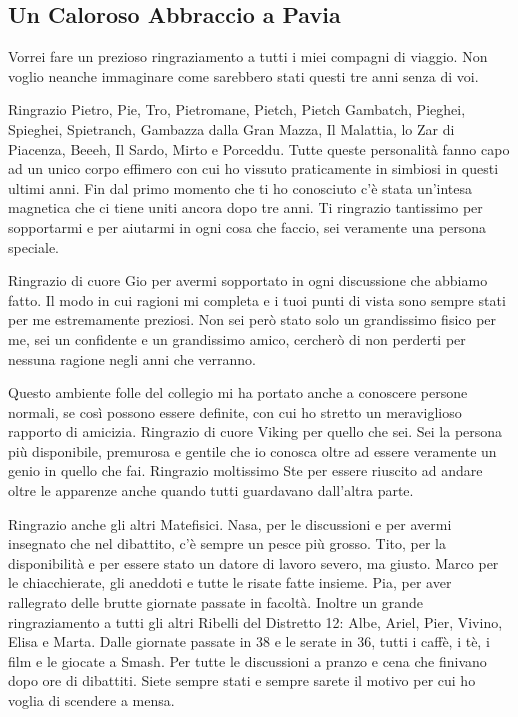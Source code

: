 \subsection*{Un Caloroso Abbraccio a Pavia}

Vorrei fare un prezioso ringraziamento a tutti i miei compagni di viaggio. Non voglio neanche immaginare come sarebbero stati questi tre anni senza di voi. 

\vspace{0.2cm}

Ringrazio Pietro, Pie, Tro, Pietromane, Pietch, Pietch Gambatch, Pieghei, Spieghei, Spietranch, Gambazza dalla Gran Mazza, Il Malattia, lo Zar di Piacenza, Beeeh, Il Sardo, Mirto e Porceddu. Tutte queste personalità fanno capo ad un unico corpo effimero con cui ho vissuto praticamente in simbiosi in questi ultimi anni. Fin dal primo momento che ti ho conosciuto c’è stata un’intesa magnetica che ci tiene uniti ancora dopo tre anni. Ti ringrazio tantissimo per sopportarmi e per aiutarmi in ogni cosa che faccio, sei veramente una persona speciale.

\vspace{0.2cm}

Ringrazio di cuore Gio per avermi sopportato in ogni discussione che abbiamo fatto. Il modo in cui ragioni mi completa e i tuoi punti di vista sono sempre stati per me estremamente preziosi. Non sei però stato solo un grandissimo fisico per me, sei un confidente e un grandissimo amico, cercherò di non perderti per nessuna ragione negli anni che verranno.

\vspace{0.2cm}

Questo ambiente folle del collegio mi ha portato anche a conoscere persone normali, se così possono essere definite, con cui ho stretto un meraviglioso rapporto di amicizia. Ringrazio di cuore Viking per quello che sei. Sei la persona più disponibile, premurosa e gentile che io conosca oltre ad essere veramente un genio in quello che fai. Ringrazio moltissimo Ste per essere riuscito ad andare oltre le apparenze anche quando tutti guardavano dall’altra parte.

\vspace{0.2cm}

Ringrazio anche gli altri Matefisici. Nasa, per le discussioni e per avermi insegnato che nel dibattito, c’è sempre un pesce più grosso. Tito, per la disponibilità e per essere stato un datore di lavoro severo, ma giusto. Marco per le chiacchierate, gli aneddoti e tutte le risate fatte insieme. Pia, per aver rallegrato delle brutte giornate passate in facoltà. Inoltre un grande ringraziamento a tutti gli altri Ribelli del Distretto 12: Albe, Ariel, Pier, Vivino, Elisa e Marta. Dalle giornate passate in 38 e le serate in 36, tutti i caffè, i tè, i film e le giocate a Smash. Per tutte le discussioni a pranzo e cena che finivano dopo ore di dibattiti. Siete sempre stati e sempre sarete il motivo per cui ho voglia di scendere a mensa.

